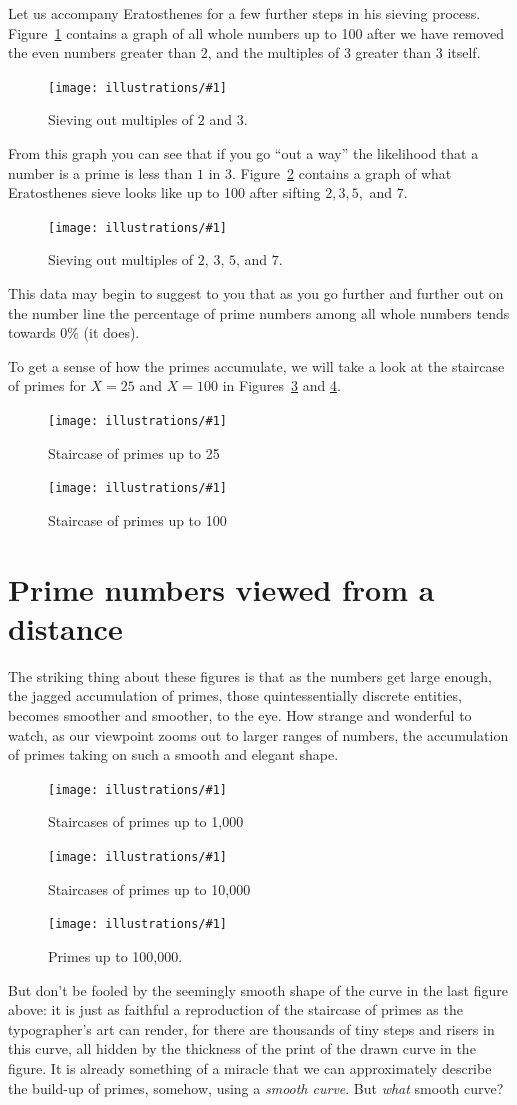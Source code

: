 \documentclass[openany]{book}
\newcommand{\ill}[3]{%
   \begin{figure}[H]%
   \vspace{-2ex}
   \centering%
   \texttt{[image: illustrations/\#1]}%
   \caption{#3}%
   \vspace{-2ex}
    \end{figure}}
\theoremstyle{plain}
\theoremstyle{definition}
\begin{document}
Let us accompany Eratosthenes for a few further steps in his sieving
process.  Figure~\ref{fig:sieve3_100} contains a graph of all whole
numbers up to 100 after we have removed the even numbers greater than
$2$, and the multiples of $3$ greater than $3$ itself.


\ill{sieves3_100}{.7}{Sieving out multiples of $2$ and $3$.\label{fig:sieve3_100}}


From this graph you can see that if you go ``out a way'' the
likelihood that a number is a prime is less than $1$ in $3
$. Figure~\ref{fig:sieve7_100} contains a graph of what Eratosthenes
sieve looks like up to 100 after sifting $2,3,5,$ and $7$.



\ill{sieves7_100}{.7}{Sieving out multiples of $2$, $3$, $5$, and $7$.\label{fig:sieve7_100}}


This data may begin to suggest to you that as you go further and
further out on the number line the percentage of prime numbers among
all whole numbers tends towards $0\%$ (it does).


To get a sense of how the primes accumulate, we will take a look at
the staircase of primes for $X= 25$ and $X=100$ in Figures~\ref{fig:staircase25}
and \ref{fig:staircase100a}.

\ill{prime_pi_25_aspect1}{.8}{Staircase of primes up to 25\label{fig:staircase25}}
\ill{prime_pi_100_aspect1}{.8}{Staircase of primes up to 100\label{fig:staircase100a}}



\chapter{Prime numbers viewed from a distance}
The striking thing about these figures is that as the numbers get
large enough, the jagged accumulation of primes, those
quintessentially discrete entities, becomes smoother and smoother, to
the eye. How strange and wonderful to watch, as our viewpoint zooms
out to larger ranges of numbers, the accumulation of primes taking on
such a smooth and elegant shape.

\ill{prime_pi_1000}{.8}{Staircases of primes up to 1,000\label{fig:staircases2}}
\ill{prime_pi_10000}{.8}{Staircases of primes up to  10{,}000\label{fig:staircases2b}}

\ill{prime_pi_100000}{.8}{Primes up to 100{,}000\label{fig:pn100000}.}



But don't be fooled by the seemingly smooth shape of the curve in the
last figure above: it is just as faithful a reproduction of the
staircase of primes as the typographer's art can render, for there are
thousands of tiny steps and risers in this curve, all hidden by the
thickness of the print of the drawn curve in the figure.  It is
already something of a miracle that we can approximately describe the
build-up of primes, somehow, using a {\em smooth curve}.  But {\em
  what} smooth curve?
\end{document}
